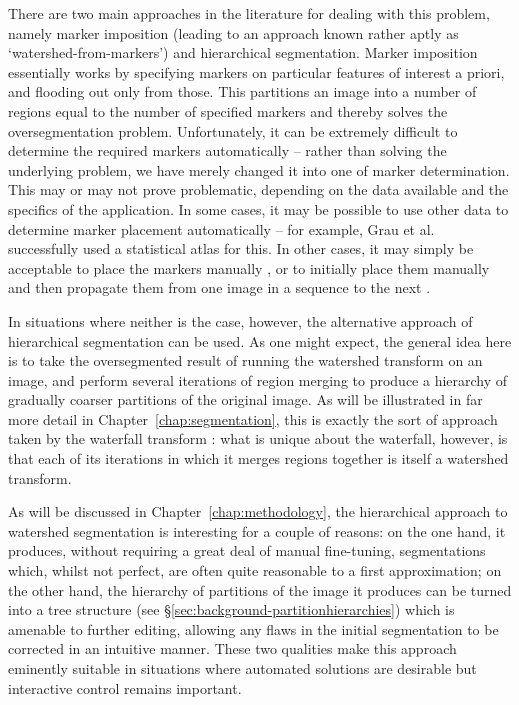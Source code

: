 There are two main approaches in the literature for dealing with this problem, namely marker imposition (leading to an approach known rather aptly as `watershed-from-markers') and hierarchical segmentation. Marker imposition essentially works by specifying markers on particular features of interest a priori, and flooding out only from those. This partitions an image into a number of regions equal to the number of specified markers and thereby solves the oversegmentation problem. Unfortunately, it can be extremely difficult to determine the required markers automatically -- rather than solving the underlying problem, we have merely changed it into one of marker determination. This may or may not prove problematic, depending on the data available and the specifics of the application. In some cases, it may be possible to use other data to determine marker placement automatically -- for example, Grau et al.\ \cite{grau04} successfully used a statistical atlas for this. In other cases, it may simply be acceptable to place the markers manually \cite{xue05}, or to initially place them manually and then propagate them from one image in a sequence to the next \cite{flores09}.

In situations where neither is the case, however, the alternative approach of hierarchical segmentation can be used. As one might expect, the general idea here is to take the oversegmented result of running the watershed transform on an image, and perform several iterations of region merging to produce a hierarchy of gradually coarser partitions of the original image. As will be illustrated in far more detail in Chapter~\ref{chap:segmentation}, this is exactly the sort of approach taken by the waterfall transform \cite{beucher90,marcotegui05}: what is unique about the waterfall, however, is that each of its iterations in which it merges regions together is itself a watershed transform.

As will be discussed in Chapter~\ref{chap:methodology}, the hierarchical approach to watershed segmentation is interesting for a couple of reasons: on the one hand, it produces, without requiring a great deal of manual fine-tuning, segmentations which, whilst not perfect, are often quite reasonable to a first approximation; on the other hand, the hierarchy of partitions of the image it produces can be turned into a tree structure (see \S\ref{sec:background-partitionhierarchies}) which is amenable to further editing, allowing any flaws in the initial segmentation to be corrected in an intuitive manner. These two qualities make this approach eminently suitable in situations where automated solutions are desirable but interactive control remains important.

